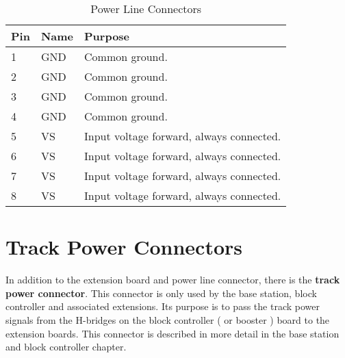 \begin{table}[!ht]
    \begin{center}
        \caption{Power Line Connectors}
        \begin{tabular}{|l|l|p{}|}
            \toprule
            \textbf{Pin} & \textbf{Name} & \textbf{Purpose} \\
            \midrule
            1 & GND & Common ground. \\
            \midrule
            2 & GND & Common ground. \\
            \midrule
            3 & GND & Common ground. \\
            \midrule
            4 & GND & Common ground. \\
            \midrule
            5 & VS & Input voltage forward, always connected. \\
            \midrule
            6 & VS & Input voltage forward, always connected. \\
            \midrule
            7 & VS & Input voltage forward, always connected. \\
            \midrule
            8 & VS & Input voltage forward, always connected. \\
            \bottomrule
        \end{tabular}
    \end{center}
\end{table}

\section{Track Power Connectors}

In addition to the extension board and power line connector, there is the \textbf{track power connector}. This connector is only used by the base station, block controller and associated extensions. Its purpose is to pass the track power signals from the H-bridges on the block controller ( or booster ) board to the extension boards. This connector is described in more detail in the base station and block controller chapter.


